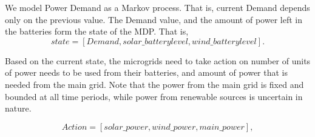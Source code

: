 \documentclass[conference]{IEEEtran}
\begin{document}
We model Power Demand as a Markov process. That is, current Demand depends only on the previous value. The Demand value, and the amount of power left in the batteries form the state of the MDP. That is, 
\begin{equation}
 state = [Demand, solar\_batterylevel, wind\_batterylevel].
\end{equation}

Based on the current state, the microgrids need to take action on number of units of power needs to be used from their batteries, and amount of power that is needed from the main grid. Note that the power from the main grid is fixed and bounded at all time periods, while power from renewable sources is uncertain in nature. 

\begin{equation}
Action = [solar\_power,wind\_power,main\_power],
\end{equation}
\end{document}
